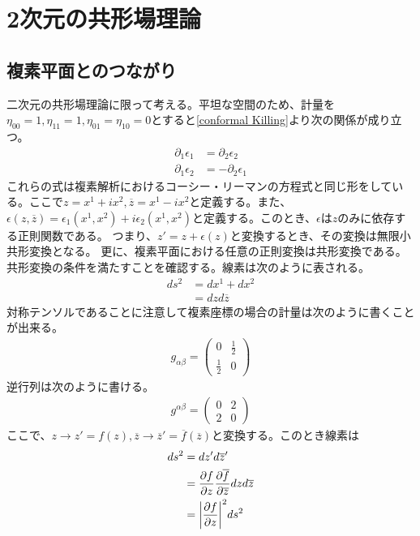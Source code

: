 \documentclass[11pt, dvipdfmx]{article}
\numberwithin{equation}{section}
\begin{document}
\section{2次元の共形場理論}
\subsection{複素平面とのつながり}
二次元の共形場理論に限って考える。平坦な空間のため、計量を$\eta_{00}=1,\eta_{11}=1,\eta _{01}=\eta_{10}=0$とすると\eqref{conformal Killing}より次の関係が成り立つ。
\begin{align}
    \partial_1\epsilon_1 &= \partial_2\epsilon_2\\
    \partial_1\epsilon_2 &= -\partial_2\epsilon_1
\end{align}
これらの式は複素解析におけるコーシー・リーマンの方程式と同じ形をしている。ここで$z=x^1+ix^2,\overline{z}=x^1-ix^2$と定義する。また、$\epsilon(z,\overline{z})=\epsilon_1(x^1,x^2)+i\epsilon_2(x^1,x^2)$と定義する。このとき、$\epsilon$は$z$のみに依存する正則関数である。
つまり、$z'=z+\epsilon(z)$と変換するとき、その変換は無限小共形変換となる。
更に、複素平面における任意の正則変換は共形変換である。
共形変換の条件を満たすことを確認する。線素は次のように表される。
\begin{align}
    ds^2 &= dx^1 + dx^2\\
    &= dz d\overline{z}  
\end{align}
対称テンソルであることに注意して複素座標の場合の計量は次のように書くことが出来る。
\begin{align}
    g_{\alpha\beta} = \begin{pmatrix}
    0 & \frac{1}{2}\\
    \frac{1}{2} & 0
    \end{pmatrix}
\end{align}
逆行列は次のように書ける。
\begin{align}
    g^{\alpha\beta} = \begin{pmatrix}
    0 & 2\\
    2 & 0
    \end{pmatrix}
\end{align}
ここで、$z \to z' = f(z), \overline{z} \to \overline{z}' = \overline{f}(\overline{z})$と変換する。このとき線素は
\begin{align}
    ds^2 &= dz' d\overline{z}'\\
    &= \pdv{f}{z}\pdv{\overline{f}}{\overline{z}} dz d\overline{z}\\
    &= \qty|\pdv{f}{z}|^2 ds^2
\end{align}
\end{document}
